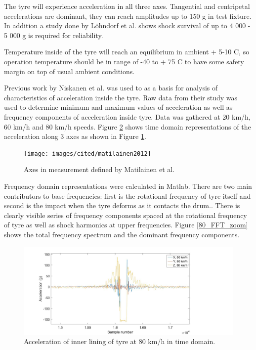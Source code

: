 The tyre will experience acceleration in all three axes\cite{Niskanen2014}. Tangential and centripetal accelerations are dominant, they can reach amplitudes up to 150 g in test fixture. In addition a study done by Löhndorf et al. \cite{Lohndorf2007} shows shock survival of up to 4 000 - 5 000 g is required for reliability. 

Temperature inside of the tyre will reach an equilibrium in ambient + 5-10 \degree C, so operation temperature should be in range of -40 to + 75 \degree C to have some safety margin on top of usual ambient conditions. 

Previous work by Niskanen et al. \cite{Niskanen2014} was used to as a basis for analysis of characteristics of acceleration inside the tyre. Raw data from their study was used to determine minimum and maximum values of acceleration as well as frequency components of acceleration inside tyre. Data was gathered at 20 km/h, 60 km/h and 80 km/h speeds. Figure \ref{80_TD} shows time domain representations of the acceleration along 3 axes as shown in Figure \ref{tyre_axes}.

\begin{figure}[htb]
\begin{center}
\texttt{[image: images/cited/matilainen2012]}
\end{center}
\caption{Axes in measurement defined by Matilainen et al. \cite{Matilainen2012}}
\label{tyre_axes}
\end{figure}

Frequency domain representations were calculated in Matlab. There are two main contributors to base frequencies: first is the rotational frequency of tyre itself and second is the impact when the tyre deforms as it contacts the drum.. There is clearly visible series of frequency components spaced at the rotational frequency of tyre as well as shock harmonics at upper frequencies. Figure \ref{80_FFT_zoom} shows the total frequency spectrum and the dominant frequency components.

\begin{figure}[htb]
\begin{center}
\includegraphics[width=\columnwidth]{images/matlab_figures/80kmh_timedomain_combined}
\end{center}
\caption{Acceleration of inner lining of tyre at 80 km/h in time domain.}
\label{80_TD}
\end{figure}

